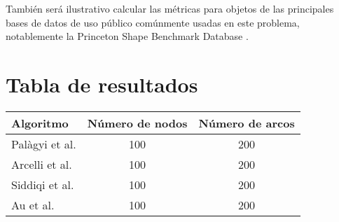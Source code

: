 También será ilustrativo calcular las métricas para objetos de las principales bases de datos de uso público comúnmente usadas en este problema, notablemente la Princeton Shape Benchmark Database \cite{shilane2004princeton}.

\section{Tabla de resultados}

\begin{center}
    \begin{tabular}{ | l | c | c |}
    \hline
    Algoritmo & Número de nodos & Número de arcos \\ \hline
    Palàgyi et al.& 100 & 200 \\ \hline
    Arcelli et al.& 100 & 200 \\ \hline
    Siddiqi et al.& 100 & 200 \\ \hline
    Au et al.& 100 & 200 \\ \hline
    \end{tabular}
\end{center}